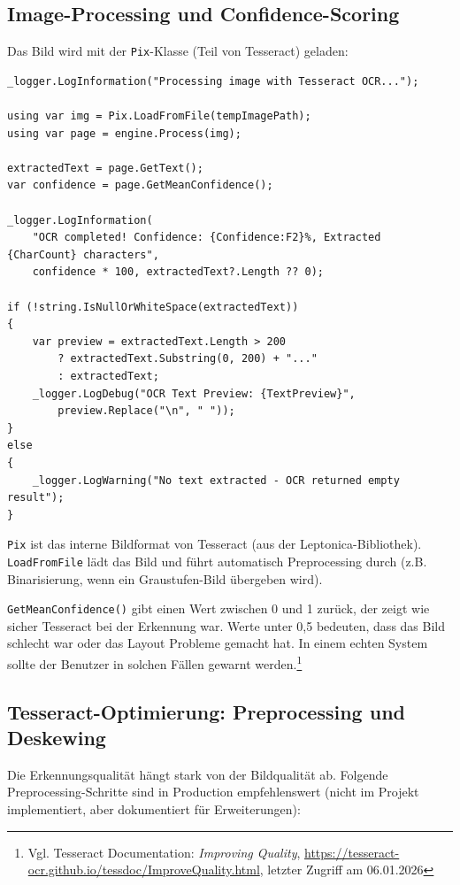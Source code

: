 \subsection{Image-Processing und Confidence-Scoring}
Das Bild wird mit der \texttt{Pix}-Klasse (Teil von Tesseract) geladen:

\begin{lstlisting}[language={[Sharp]C}, caption={OCR-Processing mit Confidence}, label={lst:ocr_processing}]
_logger.LogInformation("Processing image with Tesseract OCR...");

using var img = Pix.LoadFromFile(tempImagePath);
using var page = engine.Process(img);

extractedText = page.GetText();
var confidence = page.GetMeanConfidence();

_logger.LogInformation(
    "OCR completed! Confidence: {Confidence:F2}%, Extracted {CharCount} characters", 
    confidence * 100, extractedText?.Length ?? 0);

if (!string.IsNullOrWhiteSpace(extractedText))
{
    var preview = extractedText.Length > 200 
        ? extractedText.Substring(0, 200) + "..." 
        : extractedText;
    _logger.LogDebug("OCR Text Preview: {TextPreview}", 
        preview.Replace("\n", " "));
}
else
{
    _logger.LogWarning("No text extracted - OCR returned empty result");
}
\end{lstlisting}

\texttt{Pix} ist das interne Bildformat von Tesseract (aus der Leptonica-Bibliothek). \texttt{LoadFromFile} lädt das Bild und führt automatisch Preprocessing durch (z.B. Binarisierung, wenn ein Graustufen-Bild übergeben wird).

\texttt{GetMeanConfidence()} gibt einen Wert zwischen 0 und 1 zurück, der zeigt wie sicher Tesseract bei der Erkennung war. Werte unter 0,5 bedeuten, dass das Bild schlecht war oder das Layout Probleme gemacht hat. In einem echten System sollte der Benutzer in solchen Fällen gewarnt werden.\footnote{Vgl. Tesseract Documentation: \textit{Improving Quality}, \url{https://tesseract-ocr.github.io/tessdoc/ImproveQuality.html}, letzter Zugriff am 06.01.2026}

\subsection{Tesseract-Optimierung: Preprocessing und Deskewing}
Die Erkennungsqualität hängt stark von der Bildqualität ab. Folgende Preprocessing-Schritte sind in Production empfehlenswert (nicht im Projekt implementiert, aber dokumentiert für Erweiterungen):

